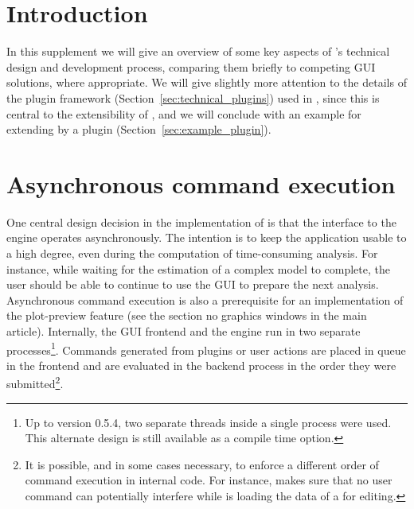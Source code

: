 \section{Introduction}
In this supplement we will give an overview of some key aspects of 's
technical design and development process, comparing them briefly to competing GUI solutions, where appropriate.
We will give slightly more attention to the details of the
plugin framework (Section~\ref{sec:technical_plugins}) used in , since this is central to the extensibility of
, and we will conclude with an example for extending  by a plugin (Section~\ref{sec:example_plugin}).

\section{Asynchronous command execution}
\label{sec:technical_asynchronous}
One central design decision in the implementation of  is that the
interface to the  engine operates asynchronously. The intention is to
keep the application usable to a high degree, even during the computation of
time-consuming analysis. For instance, while waiting for the estimation of a
complex model to complete, the user should be able to continue to use the GUI to
prepare the next analysis. Asynchronous command execution is also a prerequisite
for an implementation of the plot-preview feature (see the section no graphics windows
in the main article). Internally, the GUI frontend and the  engine run in two separate processes\footnote{
    Up to  version 0.5.4, two separate threads inside a single process were used. This alternate design is still
    available as a compile time option.
}. Commands generated from plugins or user actions are placed in queue in the frontend and are evaluated in
the backend process in the order they were submitted\footnote{
    It is possible, and in some cases necessary, to enforce a different order of command execution in
    internal code. For instance,  makes sure that no user command can
    potentially interfere while  is loading the data of a  for
    editing.
}.

